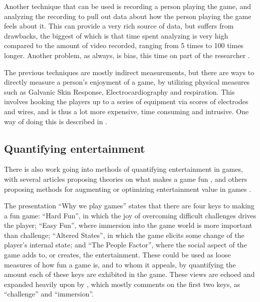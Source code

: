 \documentclass[]{report}
\begin{document}
Another technique that can be used is recording a person playing the game, and
analyzing the recording to pull out data about how the person playing the game
feels about it. This can provide a very rich source of data, but suffers from
drawbacks, the biggest of which is that time spent analyzing is very high
compared to the amount of video recorded, ranging from 5 times to 100 times
longer. Another problem, as always, is bias, this time on part of the
researcher \citep{mandryk2006using}.

The previous techniques are mostly indirect measurements, but there are ways to
directly measure a person's enjoyment of a game, by utilizing physical measures
such as Galvanic Skin Response, Electrocardiography and respiration. This
involves hooking the players up to a series of equipment via scores of
electrodes and wires, and is thus a lot more expensive, time consuming and
intrusive. One way of doing this is described in \citet{mandryk2006using}.

\subsection{Quantifying entertainment}
\label{sec:quant-entert}

There is also work going into methods of quantifying entertainment in games,
with several articles proposing theories on what makes a game fun
\citep[e.g.][]{malone1981makes,read2002endurability,
federoff2002heuristics,lazzaro2004we,koster2004theory}, and others proposing methods for augmenting
or optimizing entertainment value in games
\citep[e.g.][]{yannakakis2009real,yannakakis2008model,yannakakis2007towards,yannakakis2004interactive}.

The presentation ``Why we play games'' \citep{lazzaro2004we} states that there
are four keys to making a fun game: ``Hard Fun'', in which the joy of overcoming
difficult challenges drives the player; ``Easy Fun'', where immersion into the
game world is more important than challenge; ``Altered States'', in which the
game elicits some change of the player's internal state; and ``The People
Factor'', where the social aspect of the game adds to, or creates, the
entertainment. These could be used as loose measures of how fun a game is, and
to whom it appeals, by quantifying the amount each of these keys are exhibited
in the game. These views are echoed and expanded heavily upon by
\citet{federoff2002heuristics}, which mostly comments on the first two keys, as
``challenge'' and ``immersion''.
\end{document}
